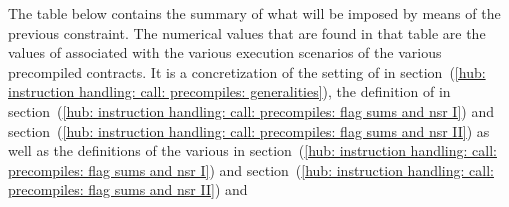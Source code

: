 The table below contains the summary of what will be imposed by means of the previous constraint.
The numerical values that are found in that table are the values of \nonStackRows{} associated with the various execution scenarios of the various precompiled contracts.
It is a concretization of 
the setting of \nonStackRows{} in section~(\ref{hub: instruction handling: call: precompiles: generalities}),
the definition of \locFirstPhaseNsr{} in
section~(\ref{hub: instruction handling: call: precompiles: flag sums and nsr I}) and
section~(\ref{hub: instruction handling: call: precompiles: flag sums and nsr II})
as well as the definitions of the various \locNsrXxx{} in
section~(\ref{hub: instruction handling: call: precompiles: flag sums and nsr I}) and
section~(\ref{hub: instruction handling: call: precompiles: flag sums and nsr II}) and
\begin{figure}[!h]
	\centering


\end{figure}
